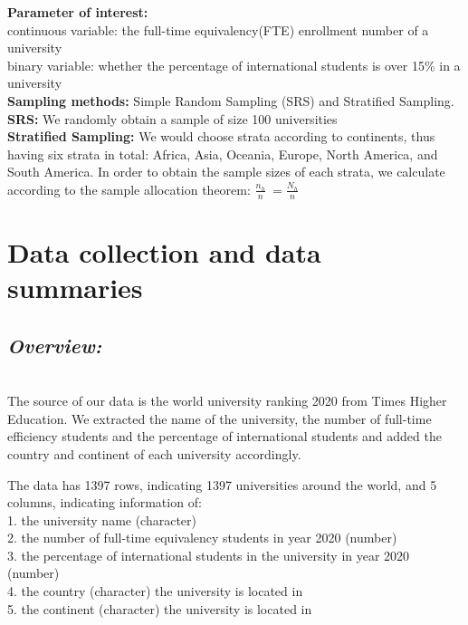 \documentclass{article}
\begin{document}
\noindent\textbf {Parameter of interest:} \\

\noindent continuous variable: the full-time equivalency(FTE) enrollment number of a university \\
binary variable: whether the percentage of international students is over 15\% in a university \\

\noindent\textbf{Sampling methods:} Simple Random Sampling (SRS) and Stratified Sampling. \\

\noindent\textbf{SRS:} We randomly obtain a sample of size 100 universities \\
\noindent\textbf{Stratified Sampling:} We would choose strata according to continents, thus having six strata in total:  Africa, Asia, Oceania, Europe, North America, and South America. In order to obtain the sample sizes of each strata, we calculate according to the sample allocation theorem:
$ \frac{n_h}{n}\ = \frac{N_h}{n}\ $ \\
\newpage
\section{Data collection and data summaries}
\subsection{{\textbf{\textit{Overview:}}}}\\
The source of our data is the world university ranking 2020 from Times Higher Education. We extracted the name of the university, the number of full-time efficiency students and the percentage of international students and added the country and continent of each university accordingly. 

\noindent  The data has 1397 rows, indicating 1397 universities around the world, and 5 columns, indicating information of:\\
    1. the university name (character)\\
    2. the number of full-time equivalency students in year 2020 (number)\\
    3. the percentage of international students in the university in year 2020 (number)\\
    4. the country (character) the university is located in\\
    5. the continent (character) the university is located in\\
    
\end{document}
